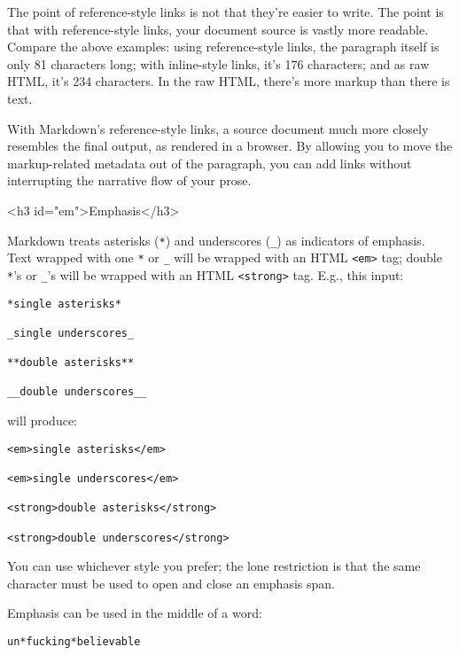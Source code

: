 The point of reference-style links is not that they're easier to
write. The point is that with reference-style links, your document
source is vastly more readable. Compare the above examples: using
reference-style links, the paragraph itself is only 81 characters
long; with inline-style links, it's 176 characters; and as raw HTML,
it's 234 characters. In the raw HTML, there's more markup than there
is text.



With Markdown's reference-style links, a source document much more
closely resembles the final output, as rendered in a browser. By
allowing you to move the markup-related metadata out of the paragraph,
you can add links without interrupting the narrative flow of your
prose.

<h3 id="em">Emphasis</h3>



Markdown treats asterisks (\texttt{*}) and underscores (\texttt{\_}) as indicators of
emphasis. Text wrapped with one \texttt{*} or \texttt{\_} will be wrapped with an
HTML \texttt{<em>} tag; double \texttt{*}'s or \texttt{\_}'s will be wrapped with an HTML
\texttt{<strong>} tag. E.g., this input:

\begin{lstlisting}
*single asterisks*

_single underscores_

**double asterisks**

__double underscores__
\end{lstlisting}




will produce:

\begin{lstlisting}
<em>single asterisks</em>

<em>single underscores</em>

<strong>double asterisks</strong>

<strong>double underscores</strong>
\end{lstlisting}




You can use whichever style you prefer; the lone restriction is that
the same character must be used to open and close an emphasis span.



Emphasis can be used in the middle of a word:

\begin{lstlisting}
un*fucking*believable
\end{lstlisting}




